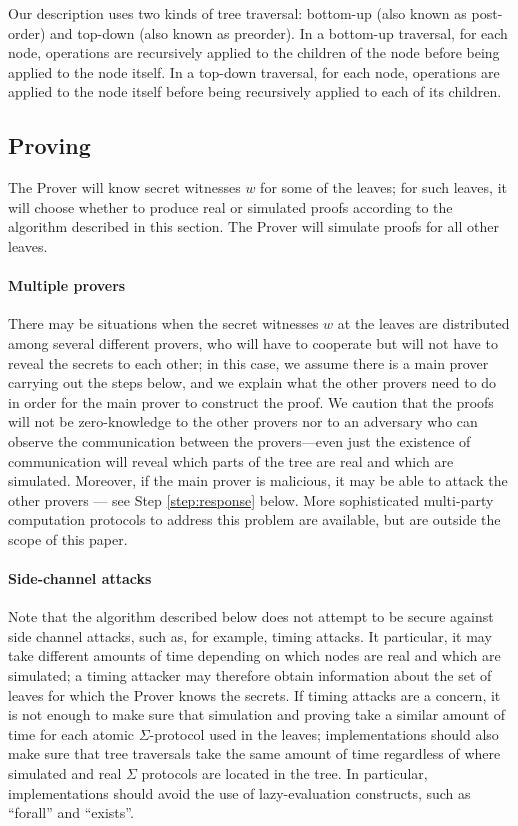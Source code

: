 \documentclass[11pt]{article}
\begin{document}
Our description uses two kinds of tree traversal: bottom-up (also known as post-order) and top-down (also known as preorder). In a bottom-up traversal, for each node, operations are recursively applied to the children of the node before being applied to the node itself. In a top-down traversal, for each node, operations are applied to the node itself before being recursively applied to each of its children.

\subsection{Proving}
\label{sec:proving}

The Prover will know secret witnesses $w$ for some of the leaves; for such leaves, it will choose whether to produce real or simulated proofs according to the algorithm described in this section. The Prover will simulate proofs for all other leaves. 

\paragraph{Multiple provers} There may be situations when the secret witnesses $w$ at the leaves are distributed among several different provers, who will have to cooperate but will not have to reveal the secrets to each other; in this case, we assume there is a main prover carrying out the steps below, and we explain what the other provers need to do in order for the main prover to construct the proof. We caution that the proofs will not be zero-knowledge to the other provers nor to an adversary who can observe the communication between the provers---even just the existence of communication will reveal which parts of the tree are real and which are simulated. Moreover, if the main prover is malicious, it may be able to attack the other provers --- see Step \ref{step:response} below. More sophisticated multi-party computation protocols to address this problem are available, but are outside the scope of this paper.


\paragraph{Side-channel attacks}
Note that the algorithm described below does not attempt to be secure against side channel attacks, such as, for example, timing attacks. It particular, it may take different amounts of time depending on which nodes are real and which are simulated; a timing attacker may therefore obtain information about the set of leaves for which the Prover knows the secrets. If timing attacks are a concern, it is not enough to make sure that simulation and proving take a similar amount of time for each atomic $\Sigma$-protocol used in the leaves; implementations should also make sure that tree traversals take the same amount of time regardless of where simulated and real $\Sigma$ protocols are located in the tree. In particular, implementations should avoid the use of lazy-evaluation constructs, such as ``forall'' and ``exists''.
\end{document}
